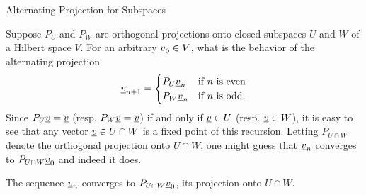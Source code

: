 \documentclass[10pt,letterpaper,english]{beamer}
\begin{document}
\begin{frame}{Alternating Projection for Subspaces}

Suppose $P_{U}$ and $P_{W}$ are orthogonal projections onto closed subspaces $U$ and $W$ of a Hilbert space $V$. For an arbitrary $\underline v_{0}\in V$, what is the behavior of the alternating projection 
\begin{equation*}
\underline v_{n+1}=\begin{cases}
P_{U}\underline v_{n} & \text{if }n\text{ is even}\\
P_{W}\underline v_{n} & \text{if }n\text{ is odd}.
\end{cases}
\end{equation*}
Since $P_{U}\underline v=\underline v$ (resp. $P_{W}\underline v=\underline v$) if and only if $\underline v\in U$ (resp. $\underline v\in W$), it is easy to see that any vector $\underline v\in U\cap W$ is a fixed point of this recursion. Letting $P_{U\cap W}$ denote the orthogonal projection onto $U\cap W$, one might guess that $\underline v_{n}$ converges to $P_{U\cap W}\underline v_{0}$ and indeed it does.

\vspace{5mm}

\begin{theorem}
The sequence $\underline v_{n}$ converges to $P_{U\cap W}\underline v_{0}$, its projection onto $U\cap W$.
\end{theorem}

\end{frame}

\end{document}
